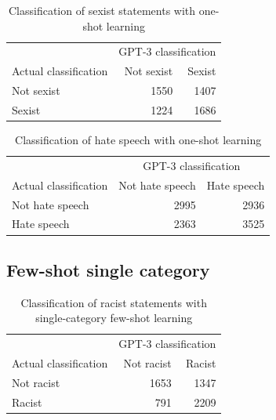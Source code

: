 \documentclass[12pt,]{article}
\begin{document}
\begin{table}[!h]

\caption{\label{tab:oneshot-sexism}Classification of sexist statements with one-shot learning}
\centering
\fontsize{8}{10}\selectfont
\begin{tabular}[t]{lrr}
\toprule
\multicolumn{1}{c}{ } & \multicolumn{2}{c}{GPT-3 classification} \\
\cmidrule(l{3pt}r{3pt}){2-3}
Actual classification & Not sexist & Sexist\\
\midrule
Not sexist & 1550 & 1407\\
Sexist & 1224 & 1686\\
\bottomrule
\end{tabular}
\end{table}

\begin{table}[!h]

\caption{\label{tab:oneshot-hate}Classification of hate speech with one-shot learning}
\centering
\fontsize{8}{10}\selectfont
\begin{tabular}[t]{lrr}
\toprule
\multicolumn{1}{c}{ } & \multicolumn{2}{c}{GPT-3 classification} \\
\cmidrule(l{3pt}r{3pt}){2-3}
Actual classification & Not hate speech & Hate speech\\
\midrule
Not hate speech & 2995 & 2936\\
Hate speech & 2363 & 3525\\
\bottomrule
\end{tabular}
\end{table}

\newpage

\hypertarget{appendixbfewshotsingle}{%
\subsection{Few-shot single category}\label{appendixbfewshotsingle}}

\begin{table}[!h]

\caption{\label{tab:fewshotsingle-racism}Classification of racist statements with single-category few-shot learning}
\centering
\fontsize{8}{10}\selectfont
\begin{tabular}[t]{lrr}
\toprule
\multicolumn{1}{c}{ } & \multicolumn{2}{c}{GPT-3 classification} \\
\cmidrule(l{3pt}r{3pt}){2-3}
Actual classification & Not racist & Racist\\
\midrule
Not racist & 1653 & 1347\\
Racist & 791 & 2209\\
\bottomrule
\end{tabular}
\end{table}
\end{document}
